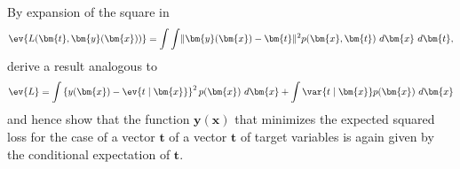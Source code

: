 \begin{question}{1.26}
	By expansion of the square in
	\begin{align*}
		\ev{L(\bm{t}, \bm{y}(\bm{x}))} = \int\int \lVert \bm{y}(\bm{x}) - \bm{t} \rVert^2 p(\bm{x}, \bm{t})\ d\bm{x}\ d\bm{t},
	\end{align*}
	derive a result analogous to
	\begin{align*}
		\ev{L} = \int \left\{ y(\bm{x}) - \ev{t \mid \bm{x}} \right\}^2 p(\bm{x})\ d\bm{x} + \int \var{t \mid \bm{x}} p(\bm{x})\ d\bm{x}
	\end{align*}
	and hence show that the function $\bm{y}(\bm{x})$ that minimizes the expected squared loss for the case of a vector $\bm{t}$ of a vector $\bm{t}$ of target variables is again given by the conditional expectation of $\bm{t}$.
\end{question}

